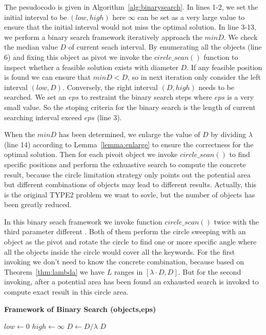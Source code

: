 \documentclass{sig-alternate}
\newcounter{example}[section]
\begin{document}
The pesudocodo is given in Algorithm~\ref{alg:binarysearch}. In lines 1-2,
we set the initial interval to be $(low, high)$ here $\infty$ can be set as a very
large value to ensure that the initial interval would not miss the optimal solution.
In line 3-13, we perform a binary search framework iteratively approach the $minD$.
We check the median value $D$ of current seach interval. By enumerating all the objects (line 6)
and fixing this object as pivot we invoke the $circle\_scan()$ function
to inspect whether a feasible solution exists with diameter $D$.
If any feasible position is found we can ensure that $minD < D$, so in next iteration
only consider the left interval $(low,D)$. Conversely, the right interval $(D,high)$
needs to be searched. We set an $eps$ to restraint the binary search steps where
$eps$ is a very small value. So the stoping criteria for the binary search is the length
of current searching interval exceed $eps$ (line 3). 

When the $minD$ has been determined, we enlarge the value of $D$ by dividing $\lambda$
(line 14) according to Lemma~\ref{lemma:enlarge} to ensure the correctness for the optimal
solution. Then for each pivoit object we invoke $circle\_scan()$ to find specific positions and perform
the exhuastive search to compute the concrete result, because the circle limitation strategy
only points out the potential area but different combinations of objects may lead to
different results. Actually, this is the original \textsf{TYPE2} problem we want to sovle, but
the number of objects has been greatly reduced.


In this binary seach framework
we invoke function $circle\_scan()$ twice with the third parameter different .
Both of them perform the circle sweeping with an object as the pivot and rotate the
circle to find one or more specific angle where all the objects inside the circle would
cover all the keywords. For the first invoking we don't need to
know the concrete combination, because based on Theorem~\ref{thm:lambda} we have
$L$ ranges in $[\lambda\cdot D, D]$.
But for the second invoking, after a potential area has been found
an exhausted search is invoked to compute exact result in this circle area.

\begin{algorithm}[!ht]\small\label{alg:binarysearch}
\caption{ \bf {Framework of Binary Search} (objects,eps)}

$low \gets 0$\;
$high \gets \infty$\;
$D \gets D/\lambda$\;
\Return $D$\;\vspace{-1ex}

\end{algorithm}
\end{document}
